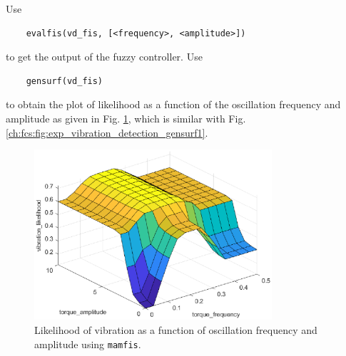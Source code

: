 Use
\begin{lstlisting}
	evalfis(vd_fis, [<frequency>, <amplitude>])
\end{lstlisting}
to get the output of the fuzzy controller. Use
\begin{lstlisting}
	gensurf(vd_fis)
\end{lstlisting}
to obtain the plot of likelihood as a function of the oscillation frequency and amplitude as given in Fig. \ref{ch:fcs:fig:exp_vibration_detection_gensurf2}, which is similar with Fig. \ref{ch:fcs:fig:exp_vibration_detection_gensurf1}.

\begin{figure}
	\centering
	\includegraphics[width=250pt]{chapters/ch-fuzzy-control-system/figures/exp_vibration_detection_gensurf2.eps}
	\caption{Likelihood of vibration as a function of oscillation frequency and amplitude using \texttt{mamfis}.}
	\label{ch:fcs:fig:exp_vibration_detection_gensurf2}
\end{figure}




